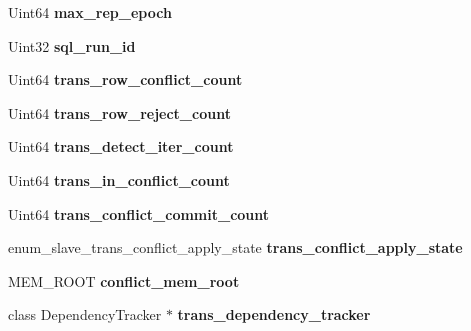 \begin{DoxyCompactItemize}
\item 
\mbox{\label{structst__ndb__slave__state_ad8941000a025edde8647762758891283}} 
Uint64 {\bfseries max\+\_\+rep\+\_\+epoch}
\item 
\mbox{\label{structst__ndb__slave__state_a3016623cb7b0dceae33398f3e3826b20}} 
Uint32 {\bfseries sql\+\_\+run\+\_\+id}
\item 
\mbox{\label{structst__ndb__slave__state_a8c3942cd26fdb9df40a846ec658f7b0d}} 
Uint64 {\bfseries trans\+\_\+row\+\_\+conflict\+\_\+count}
\item 
\mbox{\label{structst__ndb__slave__state_a37136b4e42c3c8d1da11a9b88d3a28ea}} 
Uint64 {\bfseries trans\+\_\+row\+\_\+reject\+\_\+count}
\item 
\mbox{\label{structst__ndb__slave__state_ad8c4053fd83e6af01cc7da2343378142}} 
Uint64 {\bfseries trans\+\_\+detect\+\_\+iter\+\_\+count}
\item 
\mbox{\label{structst__ndb__slave__state_a9974fd1b7a1d63ab73e9d46b8538d38e}} 
Uint64 {\bfseries trans\+\_\+in\+\_\+conflict\+\_\+count}
\item 
\mbox{\label{structst__ndb__slave__state_aba2952cc4a1181633931c632c4cc759b}} 
Uint64 {\bfseries trans\+\_\+conflict\+\_\+commit\+\_\+count}
\item 
\mbox{\label{structst__ndb__slave__state_a3fca90b4ea0cd90066cb69f76f493e6e}} 
enum\+\_\+slave\+\_\+trans\+\_\+conflict\+\_\+apply\+\_\+state {\bfseries trans\+\_\+conflict\+\_\+apply\+\_\+state}
\item 
\mbox{\label{structst__ndb__slave__state_aaad09a88edc81eb31be63e5485c35308}} 
M\+E\+M\+\_\+\+R\+O\+OT {\bfseries conflict\+\_\+mem\+\_\+root}
\item 
\mbox{\label{structst__ndb__slave__state_a5b5522aee8dba2c741cf733282a295af}} 
class Dependency\+Tracker $\ast$ {\bfseries trans\+\_\+dependency\+\_\+tracker}
\end{DoxyCompactItemize}
